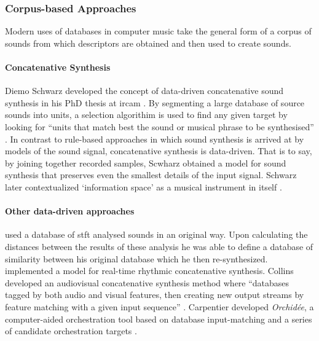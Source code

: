 \subsubsection{Corpus-based Approaches}
{
	Modern uses of databases in computer music take the general form of a corpus of sounds from which descriptors are obtained and then used to create sounds. 

	\paragraph{Concatenative Synthesis}
	Diemo Schwarz developed the concept of data-driven concatenative sound synthesis in his PhD thesis at \gls{ircam} \parencite{Schwarz2000, icmc/bbp2372.2003.099, Sch06:How}. By segmenting a large database of source sounds into units, a selection algorithim is used to find any given target by looking for ``units that match best the sound or musical phrase to be synthesised'' \parencite{Sch06:How}. In contrast to rule-based approaches in which sound synthesis is arrived at by models of the sound signal, concatenative synthesis is data-driven. That is to say, by joining together recorded samples, Scwharz obtained a model for sound synthesis that preserves even the smallest details of the input signal. Schwarz later contextualized `information space' as a musical instrument in itself \parencite{diemo_schwarz_2009_849679, Schwarz:2012}.

	\paragraph{Other data-driven approaches}
	\cite{icmc/bbp2372.2003.052} used a database of \gls{stft} analysed sounds in an original way. Upon calculating the distances between the results of these analysis he was able to define a database of similarity between his original database which he then re-synthesized. \citeauthor{Nuannicode225in2016} \parencite{Nuannicode225in2016} implemented a model for real-time rhythmic concatenative synthesis. Collins \parencite{DBLP:conf/icmc/Collins07} developed an audiovisual concatenative synthesis method where ``databases tagged by both audio and visual features, then creating new output streams by feature matching with a given input sequence'' \parencite[1]{DBLP:conf/icmc/Collins07}. Carpentier developed \textit{Orchidée}, a computer-aided orchestration tool based on database input-matching and a series of candidate orchestration targets \parencite{gregoire_carpentier_2006_849343}.

}
